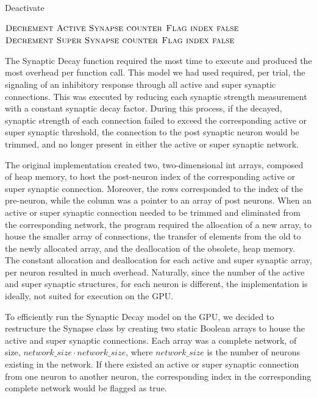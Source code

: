 \documentclass[a4paper]{article}
\begin{document}
\begin{algorithm}[H]
\caption{Deactivate}
\label{alg:deactivate}
\begin{algorithmic}
	\State $\textsc{Decrement Active Synapse counter}$
	\State $\textsc{Flag index false}$
	\State $\textsc{Decrement Super Synapse counter}$
	\State $\textsc{Flag index false}$
\EndIf
\end{algorithmic}
\end{algorithm}

The Synaptic Decay function required the most time to execute and produced the most overhead per function call. This model we had used required, per trial, the signaling of an inhibitory response through all active and super synaptic connections. This was executed by reducing each synaptic strength measurement with a constant synaptic decay factor. During this process, if the decayed, synaptic strength of each connection failed to exceed the corresponding active or super synaptic threshold, the connection to the post synaptic neuron would be trimmed, and no longer present in either the active or super synaptic network.

The original implementation created two, two-dimensional int arrays, composed of heap memory, to host the post-neuron index of the corresponding active or super synaptic connection. Moreover, the rows corresponded to the index of the pre-neuron, while the column was a pointer to an array of post neurons. When an active or super synaptic connection needed to be trimmed and eliminated from the corresponding network, the program required the allocation of a new array, to house the smaller array of connections, the transfer of elements from the old to the newly allocated array, and the deallocation of the obsolete, heap memory. The constant allocation and deallocation for each active and super synaptic array, per neuron resulted in much overhead. Naturally, since the number of the active and super synaptic structures, for each neuron is different, the implementation is ideally, not suited for execution on the GPU. 

To efficiently run the Synaptic Decay model on the GPU, we decided to restructure the Synapse class by creating two static Boolean arrays to house the active and super synaptic connections. Each array was a complete network, of size, $network\_size\cdot network\_size$, where $network\_size$ is the number of neurons existing in the network. If there existed an active or super synaptic connection from one neuron to another neuron, the corresponding index in the corresponding complete network would be flagged as true. 
\end{document}
